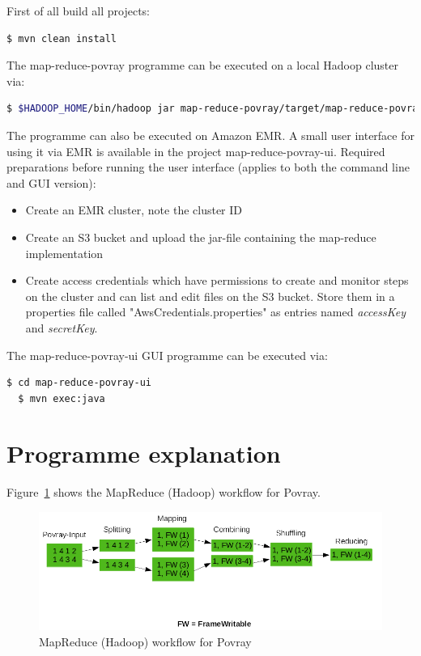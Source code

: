 \documentclass{article}
\begin{document}
First of all build all projects:

\begin{lstlisting}[language=bash, deletekeywords={cd}]
  $ mvn clean install
\end{lstlisting}

The map-reduce-povray programme can be executed on a local Hadoop cluster via:

\begin{lstlisting}[language=bash, deletekeywords={cd}]
  $ $HADOOP_HOME/bin/hadoop jar map-reduce-povray/target/map-reduce-povray-1.0.jar mapReducePovray.Povray <input-dir> <output-dir> <uri-of-pov-file>
\end{lstlisting}

The programme can also be executed on Amazon EMR. A small user interface for using it via EMR is available in the project map-reduce-povray-ui. Required preparations before running the user interface (applies to both the command line and GUI version):

\begin{itemize}
\item Create an EMR cluster, note the cluster ID
\item Create an S3 bucket and upload the jar-file containing the map-reduce implementation
\item Create access credentials which have permissions to create and monitor steps on the cluster and can list and edit files on the S3 bucket. Store them in a properties file called "AwsCredentials.properties" as entries named \emph{accessKey} and \emph{secretKey}.
\end{itemize}

The map-reduce-povray-ui GUI programme can be executed via:

\begin{lstlisting}[language=bash, deletekeywords={cd}]
  $ cd map-reduce-povray-ui
  $ mvn exec:java
\end{lstlisting}

\section{Programme explanation}

Figure~\ref{fig:map-reduce-povray-workflow} shows the MapReduce (Hadoop) workflow for Povray.

\begin{figure}[htbp]
\begin{center}
\includegraphics[width=\textwidth]{map-reduce-povray-workflow.png}
\caption{MapReduce (Hadoop) workflow for Povray}
\label{fig:map-reduce-povray-workflow}
\end{center}
\end{figure}
\end{document}
